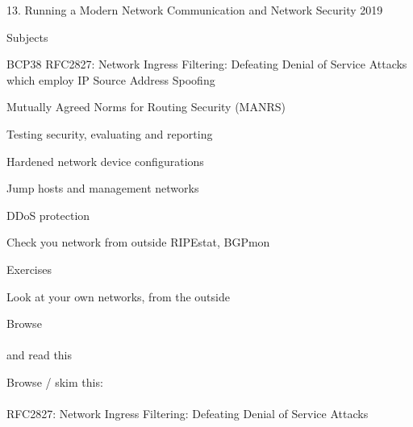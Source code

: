 \documentclass[Screen16to9,17pt]{foils}
\begin{document}
\mytitlepage
{13. Running a Modern Network}
{Communication and Network Security 2019}



\begin{list1}
\item Subjects
\begin{list2}
\item BCP38 RFC2827: Network Ingress Filtering: Defeating Denial of Service Attacks\\
 which employ IP Source Address Spoofing
\item Mutually Agreed Norms for Routing Security (MANRS)
\item Testing security, evaluating and reporting
\item Hardened network device configurations
\item Jump hosts and management networks
\item DDoS protection
\item Check you network from outside RIPEstat, BGPmon
\end{list2}
\item Exercises
\begin{list2}
\item Look at your own networks, from the outside
\end{list2}
\end{list1}




\begin{list1}
\item Browse\\
\\
and read this\\ {\small{}}
\item Browse / skim this:\\
{\small{}}\\
RFC2827: Network Ingress Filtering: Defeating Denial of Service Attacks
\end{list1}


\end{document}
